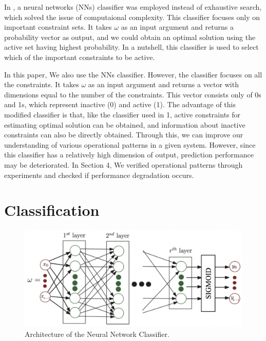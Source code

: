 \documentclass[11pt]{article}
\begin{document}
In \cite{learning_dc_opf}, a neural networks (NNs) classifier was employed instead of exhaustive search, which solved the issue of computaional complexity. This classifier focuses only on important constraint sets. It takes $\omega$ as an input argument and returns a probability vector as output, and we could obtain an optimal solution using the active set having highest probability. In a nutshell, this classifier is used to select which of the important constraints to be active.

In this paper, We also use the NNs classifier. However, the classifier focuses on all the constraints. It takes $\omega$ as an input argument and returns a vector with dimensions equal to the number of the constraints. This vector consists only of 0s and 1s, which represent inactive (0) and active (1). 
The advantage of this modified classifier is that, like the classifier used in 1, active constraints for estimating optimal solution can be obtained, and information about inactive constraints can also be directly obtained. Through this, we can improve our understanding of various operational patterns in a given system. However, since this classifier has a relatively high dimension of output, prediction performance may be deteriorated.
In Section 4, We verified operational patterns through experiments and checked if performance degradation occurs.



\section{Classification}\label{sec:classication}

\begin{figure}[h]\label{fig:nns_arch}
\centering
\includegraphics[scale=0.5]{report/figure/NNs_arch.png}
\caption{Architecture of the Neural Network Classifier.}
\end{figure}
\end{document}
